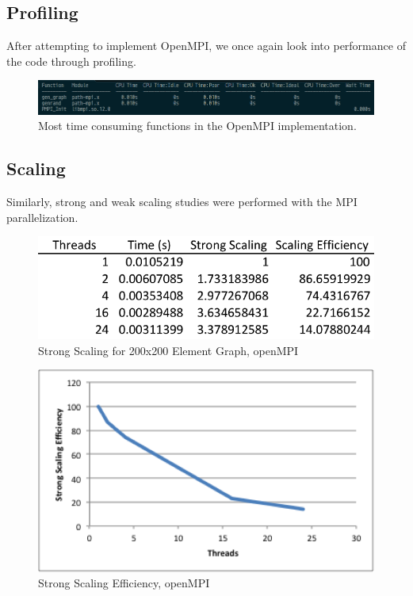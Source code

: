 \documentclass{article}
\begin{document}
\subsection{Profiling}
After attempting to implement OpenMPI, we once again look into performance of the code through profiling. 
	\begin{figure}[h!]
		\begin{center}
			\includegraphics[width=0.7\columnwidth]{amplxe_mpi}
			\caption{Most time consuming functions in the OpenMPI implementation.}
			\label{amplxe_mpi}
		\end{center}
	\end{figure}

\subsection{Scaling}
Similarly, strong and weak scaling studies were performed with the MPI parallelization.

	\begin{figure}[h!]
		\begin{center}
			\includegraphics[width=0.5\columnwidth]{st_table_mpi}
			\caption{Strong Scaling for 200x200 Element Graph, openMPI}
			\label{st_mpi_t}
		\end{center}
	\end{figure}
	
	\begin{figure}[h!]
		\begin{center}
			\includegraphics[width=0.7\columnwidth]{st_graph_mpi}
			\caption{Strong Scaling Efficiency, openMPI}
			\label{st_mpi_g}
		\end{center}
	\end{figure}
	
\end{document}
